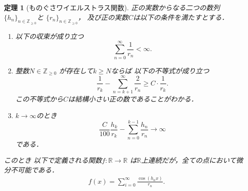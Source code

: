 \documentclass[leqno, a4paper, 12pt]{jsarticle}
\newtheorem{thm}{定理}
\newcommand{\zz}{\mathbb{Z}}
\newcommand{\rr}{\mathbb{R}}
\begin{document}
\begin{thm}[ものぐさワイエルストラス関数]\label{thm:app2}
正の実数からなる二つの数列
$\{h_{n}\}_{n\in\zz_{\ge 0}}$と
$\{r_{n}\}_{n\in \zz_{\ge 0}}$，
及び正の実数$C$は以下の条件を満たすとする．
\begin{enumerate}[label=\textup{(B\arabic*)}]
\item\label{item:sum2}
以下の収束が成り立つ
\[
\sum_{n=0}^{\infty}\frac{1}{r_{n}}<\infty.
\]
\item\label{item:partisum2}
整数$N\in \zz_{\ge 0}$
が存在して$k\ge N$ならば
以下の不等式が成り立つ
\[
\frac{1}{r_{k}}-\sum_{n=k+1}^{\infty}\frac{2}{r_{n}}
\ge C\cdot \frac{1}{r_{k}}. 
\]
この不等式から$C$は結構小さい正の数であることがわかる．
\item\label{item:div2}
$k\to \infty$のとき
\[
\frac{C}{100}
\frac{h_{k}}{r_{k}}
-
\sum_{n=0}^{k-1}\frac{h_{n}}{r_{n}}\to \infty
\]
である．

\end{enumerate}
このとき
以下で定義される関数$f\colon \rr\to \rr$
は$\rr$上連続だが，全ての点において微分不可能である．
\begin{align*}
f(x)=\sum_{i=0}^{\infty}\frac{\cos(h_{n}x)}{r_{n}}. 
\end{align*}
\end{thm}
\end{document}
